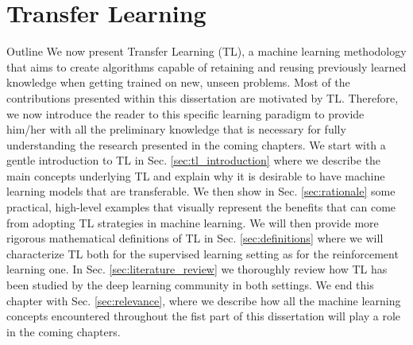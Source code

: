\chapter{Transfer Learning}
\label{ch:transfer_learning}

\begin{remark}{Outline}
	We now present Transfer Learning (TL), a machine learning methodology that aims to create algorithms capable of retaining and reusing previously learned knowledge when getting trained on new, unseen problems. Most of the contributions presented within this dissertation are motivated by TL. Therefore, we now introduce the reader to this specific learning paradigm to provide him/her with all the preliminary knowledge that is necessary for fully understanding the research presented in the coming chapters. We start with a gentle introduction to TL in Sec. \ref{sec:tl_introduction} where we describe the main concepts underlying TL and explain why it is desirable to have machine learning models that are transferable. We then show in Sec. \ref{sec:rationale} some practical, high-level examples that visually represent the benefits that can come from adopting TL strategies in machine learning. We will then provide more rigorous mathematical definitions of TL in Sec. \ref{sec:definitions} where we will characterize TL both for the supervised learning setting as for the reinforcement learning one. In Sec. \ref{sec:literature_review} we thoroughly review how TL has been studied by the deep learning community in both settings. We end this chapter with Sec. \ref{sec:relevance}, where we describe how all the machine learning concepts encountered throughout the fist part of this dissertation will play a role in the coming chapters.  
\end{remark}

